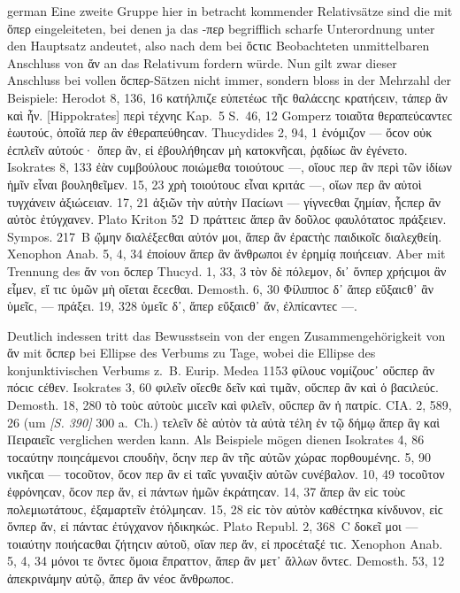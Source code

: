 \begin{otherlanguage*}{german}
Eine zweite Gruppe hier in betracht kommender Relativsätze sind die mit ὅπερ eingeleiteten, bei denen ja das -περ begrifflich scharfe Unterordnung unter den Hauptsatz andeutet, also nach dem bei ὅϲτιϲ Beobachteten unmittelbaren Anschluss von ἄν an das Relativum fordern würde. Nun gilt zwar dieser Anschluss bei vollen ὅϲπερ-Sätzen nicht immer, sondern bloss in der Mehrzahl der Beispiele: Herodot 8, 136, 16 κατήλπιζε εὐπετέωϲ τῆϲ θαλάϲϲηϲ κρατήϲειν, τάπερ ἂν καὶ ἦν. [Hippokrates] περὶ τέχνηϲ Kap.~5 S.~46, 12 Gomperz τοιαῦτα θεραπεύϲαντεϲ ἑωυτούϲ, ὁποῖά περ ἂν ἐθεραπεύθηϲαν. Thucydides 2, 94, 1 ἐνόμιζον — ὅϲον οὐκ ἐϲπλεῖν αὐτούϲ· ὅπερ ἂν, εἰ ἐβουλήθηϲαν μὴ κατοκνῆϲαι, ῥᾳδίωϲ ἂν ἐγένετο. Isokrates 8, 133 ἐὰν ϲυμβούλουϲ ποιώμεθα τοιούτουϲ —, οἵουϲ περ ἂν περὶ τῶν ἰδίων ἡμῖν εἶναι βουληθεῖμεν. 15, 23 χρὴ τοιούτουϲ εἶναι κριτάϲ —, οἵων περ ἂν αὐτοὶ τυγχάνειν ἀξιώϲειαν. 17, 21 ἀξιῶν τὴν αὐτὴν Παϲίωνι — γίγνεϲθαι ζημίαν, ἧϲπερ ἂν αὐτὸϲ ἐτύγχανεν. Plato Kriton 52~D πράττειϲ ἅπερ ἂν δοῦλοϲ φαυλότατοϲ πράξειεν. Sympos. 217~Β ᾤμην διαλέξεϲθαι αὐτόν μοι, ἅπερ ἂν ἐραϲτὴϲ παιδικοῖϲ διαλεχθείη. Xenophon Anab. 5, 4, 34 ἐποίουν ἅπερ ἂν ἄνθρωποι ἐν ἐρημίᾳ ποιήϲειαν. Aber mit Trennung des ἄν von ὅϲπερ Thucyd. 1, 33, 3 τὸν δὲ πόλεμον, δι᾽ ὅνπερ χρήϲιμοι ἂν εἶμεν, εἴ τιϲ ὑμῶν μὴ οἴεται ἔϲεϲθαι. Demosth. 6, 30 Φίλιπποϲ δ᾽ ἅπερ εὔξαιϲθ᾽ ἂν ὑμεῖϲ, — πράξει. 19, 328 ὑμεῖϲ δ᾽, ἅπερ εὔξαιϲθ᾽ ἄν, ἐλπίϲαντεϲ —.

Deutlich indessen tritt das Bewusstsein von der engen Zusammengehörigkeit von ἄν mit ὅϲπερ bei Ellipse des Verbums zu Tage, wobei die Ellipse des konjunktivischen Verbums z.~B. Eurip. Medea 1153 φίλουϲ νομίζουϲ᾽ οὕϲπερ ἂν πόϲιϲ ϲέθεν. Isokrates 3, 60 φιλεῖν οἴεϲθε δεῖν καὶ τιμᾶν, οὕϲπερ ἂν καὶ ὁ βαϲιλεύϲ. Demosth. 18, 280 τὸ τοὺϲ αὐτοὺϲ μιϲεῖν καὶ φιλεῖν, οὕϲπερ ἂν ἡ πατρίϲ. CIA. 2, 589, 26 (um \hypertarget{p390}{\emph{[S. 390]}}\label{p390} 300 a.~Ch.) τελεῖν δὲ αὐτὸν τὰ αὐτὰ τέλη ἐν τῷ δήμῳ ἅπερ ἂγ καὶ Πειραιεῖϲ verglichen werden kann. Als Beispiele mögen dienen Isokrates 4, 86 τοϲαύτην ποιηϲάμενοι ϲπουδὴν, ὅϲην περ ἂν τῆϲ αὑτῶν χώραϲ πορθουμένηϲ. 5, 90 νικῆϲαι — τοϲοῦτον, ὅϲον περ ἂν εἰ ταῖϲ γυναιξὶν αὐτῶν ϲυνέβαλον. 10, 49 τοϲοῦτον ἐφρόνηϲαν, ὅϲον περ ἄν, εἰ πάντων ἡμῶν ἐκράτηϲαν. 14, 37 ἅπερ ἂν εἰϲ τοὺϲ πολεμιωτάτουϲ, ἐξαμαρτεῖν ἐτόλμηϲαν. 15, 28 εἰϲ τὸν αὐτὸν καθέϲτηκα κίνδυνον, εἰϲ ὅνπερ ἄν, εἰ πάνταϲ ἐτύγχανον ἠδικηκώϲ. Plato Republ. 2, 368~C δοκεῖ μοι — τοιαύτην ποιήϲαϲθαι ζήτηϲιν αὐτοῦ, οἵαν περ ἄν, εἰ προϲέταξέ τιϲ. Xenophon Anab. 5, 4, 34 μόνοι τε ὄντεϲ ὅμοια ἔπραττον, ἅπερ ἂν μετ᾽ ἄλλων ὄντεϲ. Demosth. 53, 12 ἀπεκρινάμην αὐτῷ, ἅπερ ἂν νέοϲ ἄνθρωποϲ.


\end{otherlanguage*}
